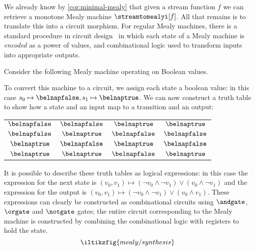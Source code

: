We already know by \cref{cor:minimal-mealy} that given a stream function
\(f\) we can retrieve a monotone Mealy machine \(\streamtomealyi[f]\).
All that remains is to translate this into a circuit morphism.
For regular Mealy machines, there is a standard procedure in circuit
design~\cite{kohavi2009switching} in which each state of a Mealy machine is
\emph{encoded} as a power of values, and combinational logic used to transform
inputs into appropriate outputs.

\begin{example}
    Consider the following Mealy machine operating on Boolean values.
    \begin{center}
        
    \end{center}
    \vspace{-\belowdisplayskip}
    To convert this machine to a circuit, we assign each state a boolean value:
    in this case \(s_0 \mapsto \belnapfalse, s_1 \mapsto \belnaptrue\).
    We can now construct a truth table to show how a state and an input map to
    a transition and an output:
    \begin{center}
        \begin{tabular}{cc|cc}
            \(\belnapfalse\) & \(\belnapfalse\) & \(\belnaptrue\)  & \(\belnaptrue\)  \\
            \(\belnapfalse\) & \(\belnaptrue\)  & \(\belnapfalse\) & \(\belnapfalse\) \\
            \(\belnaptrue\)  & \(\belnapfalse\) & \(\belnaptrue\)  & \(\belnapfalse\) \\
            \(\belnaptrue\)  & \(\belnaptrue\)  & \(\belnapfalse\) & \(\belnaptrue\)  \\
        \end{tabular}
    \end{center}
    It is possible to describe these truth tables as logical expressions: in
    this case the expression for the next state is \(
    (v_0, v_1)
    \mapsto
    (\neg v_0 \land \neg v_1) \lor (v_0 \land \neg v_1)
    \) and the expression for the output is \(
    (v_0, v_1)
    \mapsto
    (\neg v_0 \land \neg v_1) \lor (v_0 \land v_1)
    \).
    These expressions can clearly be constructed as combinational circuits using
    \(\andgate\), \(\orgate\) and \(\notgate\) gates; the entire circuit
    corresponding to the Mealy machine is constructed by combining the
    combinational logic with registers to hold the state.
    \[\iltikzfig{mealy/synthesis}\]
\end{example}

